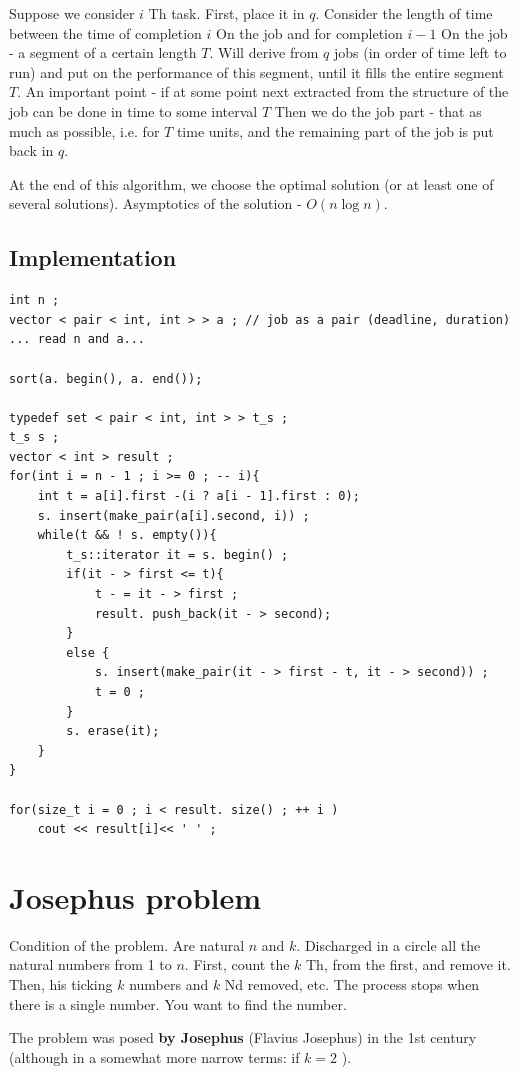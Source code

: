 Suppose we consider $i$ Th task. First, place it in $q$. Consider the length of time between the time of completion $i$ On the job and for completion $i-1$ On the job - a segment of a certain length $T$. Will derive from $q$ jobs (in order of time left to run) and put on the performance of this segment, until it fills the entire segment $T$. An important point - if at some point next extracted from the structure of the job can be done in time to some interval $T$ Then we do the job part - that as much as possible, i.e. for $T$ time units, and the remaining part of the job is put back in $q$.

At the end of this algorithm, we choose the optimal solution (or at least one of several solutions). Asymptotics of the solution - $O (n \log n)$.

\subsection{ Implementation }

\begin{verbatim}
int n ;
vector < pair < int, int > > a ; // job as a pair (deadline, duration)
... read n and a...
 
sort(a. begin(), a. end());
 
typedef set < pair < int, int > > t_s ;
t_s s ;
vector < int > result ;
for(int i = n - 1 ; i >= 0 ; -- i){
    int t = a[i].first -(i ? a[i - 1].first : 0);
    s. insert(make_pair(a[i].second, i)) ;
    while(t && ! s. empty()){
        t_s::iterator it = s. begin() ;
        if(it - > first <= t){
            t - = it - > first ;
            result. push_back(it - > second);
        }
        else {
            s. insert(make_pair(it - > first - t, it - > second)) ;
            t = 0 ;
        }
        s. erase(it);
    }
}
 
for(size_t i = 0 ; i < result. size() ; ++ i )
    cout << result[i]<< ' ' ; 
\end{verbatim}
\section{ Josephus problem }
Condition of the problem. Are natural $n$ and $k$. Discharged in a circle all the natural numbers from 1 to $n$. First, count the $k$ Th, from the first, and remove it. Then, his ticking $k$ numbers and $k$ Nd removed, etc. The process stops when there is a single number. You want to find the number.

The problem was posed \textbf{by Josephus} (Flavius ​​Josephus) in the 1st century (although in a somewhat more narrow terms: if $k = 2$ ).

